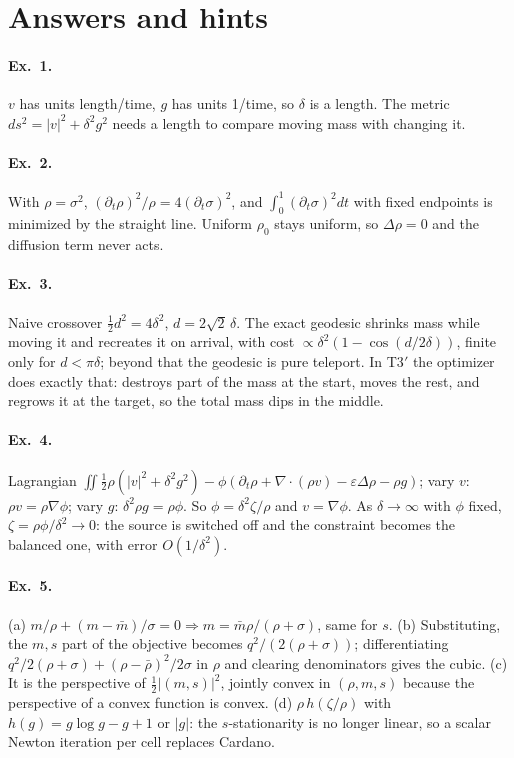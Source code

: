 \documentclass[11pt]{article}
\newcommand{\eps}{\varepsilon}
\newcommand{\dv}{\nabla\cdot}
\newcounter{ex}
\begin{document}
\appendix
\section{Answers and hints}
\label{sec:answers}

\paragraph{Ex.\ 1.} $v$ has units length/time, $g$ has units 1/time, so $\delta$ is a length.
The metric $ds^2=|v|^2+\delta^2g^2$ needs a length to compare moving mass with changing it.

\paragraph{Ex.\ 2.} With $\rho=\sigma^2$, $(\partial_t\rho)^2/\rho=4(\partial_t\sigma)^2$, and
$\int_0^1(\partial_t\sigma)^2dt$ with fixed endpoints is minimized by the straight line. Uniform
$\rho_0$ stays uniform, so $\Delta\rho=0$ and the diffusion term never acts.

\paragraph{Ex.\ 3.} Naive crossover $\tfrac12d^2=4\delta^2$, $d=2\sqrt2\,\delta$. The exact
geodesic shrinks mass while moving it and recreates it on arrival, with cost
$\propto\delta^2(1-\cos(d/2\delta))$, finite only for $d<\pi\delta$; beyond that the geodesic
is pure teleport. In T3$'$ the optimizer does exactly that: destroys part of the mass at the
start, moves the rest, and regrows it at the target, so the total mass dips in the middle.

\paragraph{Ex.\ 4.} Lagrangian $\iint\tfrac12\rho(|v|^2+\delta^2g^2)-\phi(\partial_t\rho+\dv(\rho v)-\eps\Delta\rho-\rho g)$;
vary $v$: $\rho v=\rho\nabla\phi$; vary $g$: $\delta^2\rho g=\rho\phi$. So
$\phi=\delta^2\zeta/\rho$ and $v=\nabla\phi$. As $\delta\to\infty$ with $\phi$ fixed,
$\zeta=\rho\phi/\delta^2\to0$: the source is switched off and the constraint becomes the
balanced one, with error $O(1/\delta^2)$.

\paragraph{Ex.\ 5.} (a) $m/\rho+(m-\bar m)/\sigma=0\Rightarrow m=\bar m\rho/(\rho+\sigma)$, same
for $s$. (b) Substituting, the $m,s$ part of the objective becomes $q^2/(2(\rho+\sigma))$;
differentiating $q^2/2(\rho+\sigma)+(\rho-\bar\rho)^2/2\sigma$ in $\rho$ and clearing
denominators gives the cubic. (c) It is the perspective of $\tfrac12|(m,s)|^2$, jointly
convex in $(\rho,m,s)$ because the perspective of a convex function is convex. (d)
$\rho\,h(\zeta/\rho)$ with $h(g)=g\log g-g+1$ or $|g|$: the $s$-stationarity is no longer
linear, so a scalar Newton iteration per cell replaces Cardano.
\end{document}
